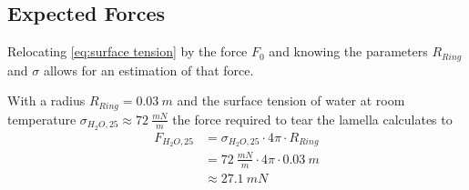         \subsection{Expected Forces}\label{sec:A10 expected forces}%
        Relocating \cref{eq:surface tension} by the force \(F_0\) and knowing the parameters \(R_{Ring}\) and \(\sigma\) allows
        for an estimation of that force.\par
        With a radius \(R_{Ring} = \SI{0.03}{m}\) and the surface tension of water at room temperature \(\sigma_{H_2O,25} \approx \SI{72}{\frac{mN}{m}}\) \cite{surface.tension.of.pure.water.Pallas.Harrison.1990}
        the force required to tear the lamella calculates to
        \begin{align}
            F_{H_2O,25} &= \sigma_{H_2O,25} \cdot 4\pi \cdot R_{Ring} \nonumber \\
                        &= \SI{72}{\frac{mN}{m}} \cdot 4\pi \cdot \SI{0.03}{m} \nonumber \\
                        &\approx \SI{27.1}{mN}
        \end{align}
